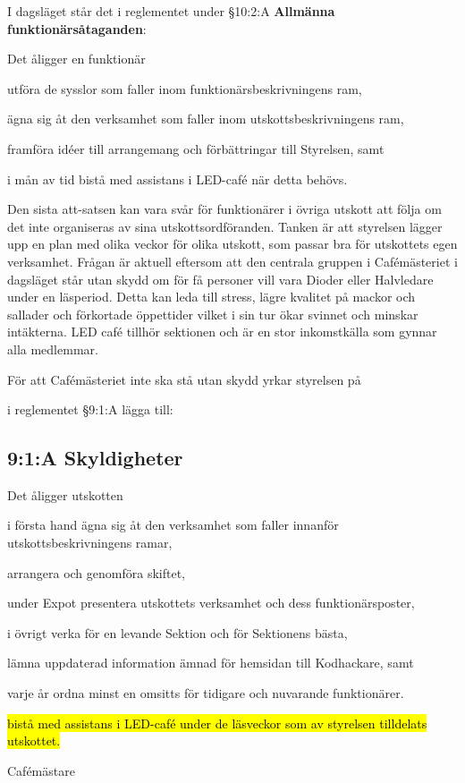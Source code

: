 \documentclass[../_main/handlingar.tex]{subfiles}
\begin{document}
I dagsläget står det i reglementet under \S10:2:A \textbf{Allmänna funktionärsåtaganden}:\par

Det åligger en funktionär
\begin{attlist}
    \item utföra de sysslor som faller inom funktionärsbeskrivningens ram,
    \item ägna sig åt den verksamhet som faller inom utskottsbeskrivningens ram,
    \item framföra idéer till arrangemang och förbättringar till Styrelsen, samt
    \item i mån av tid bistå med assistans i LED-café när detta behövs.
\end{attlist}

Den sista att-satsen kan vara svår för funktionärer i övriga utskott att följa om det inte organiseras av sina utskottsordföranden. Tanken är att styrelsen lägger upp en plan med olika veckor för olika utskott, som passar bra för utskottets egen verksamhet. Frågan är aktuell eftersom att den centrala gruppen i Cafémästeriet i dagsläget står utan skydd om för få personer vill vara Dioder eller Halvledare under en läsperiod. Detta kan leda till stress, lägre kvalitet på mackor och sallader och förkortade öppettider vilket i sin tur ökar svinnet och minskar intäkterna. LED café tillhör sektionen och är en stor inkomstkälla som gynnar alla medlemmar.

För att Cafémästeriet inte ska stå utan skydd yrkar styrelsen på
\begin{attsatser}
    \att i reglementet \S9:1:A lägga till: \par
    \subsection*{9:1:A Skyldigheter}
    Det åligger utskotten
    \begin{attlist}
        \item i första hand ägna sig åt den verksamhet som faller innanför
        utskottsbeskrivningens ramar,
        \item arrangera och genomföra skiftet,
        \item under Expot presentera utskottets verksamhet och dess
        funktionärsposter,
        \item i övrigt verka för en levande Sektion och för Sektionens bästa,
        \item lämna uppdaterad information ämnad för hemsidan till Kodhackare, samt
        \item varje år ordna minst en omsitts för tidigare och nuvarande
        funktionärer.
        \item \hl{bistå med assistans i LED-café under de läsveckor som av styrelsen tilldelats utskottet.}
    \end{attlist}
    \changenote
\end{attsatser}

\begin{signatures}{1}
    \ist
\signature{Elin Johansson}{Cafémästare}
\end{signatures}
\end{document}
